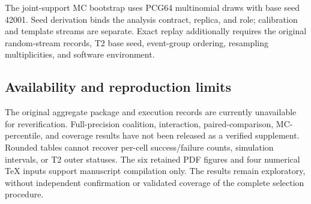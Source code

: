 \documentclass[aps,prd,reprint,superscriptaddress,nofootinbib,longbibliography,floatfix]{revtex4-2}
\begin{document}
The joint-support MC bootstrap uses PCG64 multinomial draws with base seed
42001. Seed derivation binds the analysis contract, replica, and role;
calibration and template streams are separate. Exact replay additionally
requires the original random-stream records, T2 base seed, event-group
ordering, resampling multiplicities, and software environment.

\subsection{Availability and reproduction limits}

The original aggregate package and execution records are currently unavailable
for reverification. Full-precision coalition, interaction, paired-comparison,
MC-percentile, and coverage results have not been released as a verified
supplement. Rounded tables cannot recover per-cell success/failure counts,
simulation intervals, or T2 outer statuses. The six retained PDF figures and
four numerical TeX inputs support manuscript compilation only. The results
remain exploratory, without independent confirmation or validated coverage
of the complete selection procedure.

\clearpage
\twocolumngrid

\end{document}
